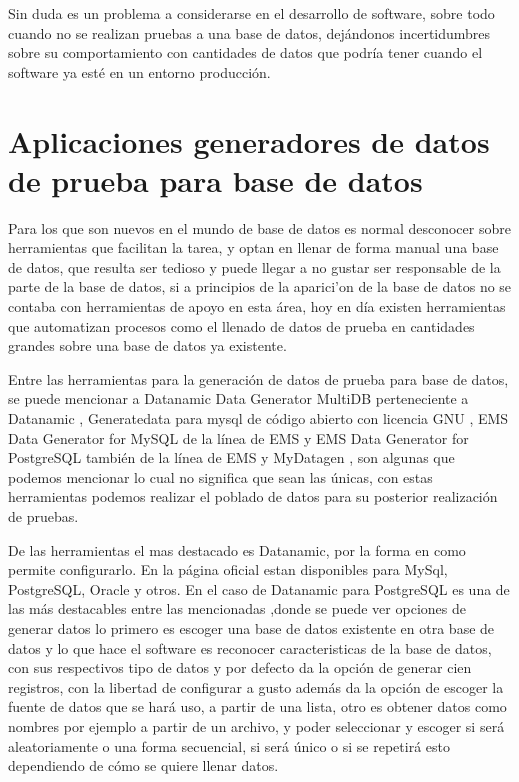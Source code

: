 Sin duda es un problema a considerarse en el desarrollo de software, sobre todo cuando no se realizan pruebas a una base de datos, dej\'andonos incertidumbres sobre su comportamiento con cantidades de datos que podr\'ia tener cuando el software ya est\'e en un entorno producci\'on.
\section{Aplicaciones generadores de datos de prueba para base de datos}
Para los que son nuevos en el mundo de base de datos es normal desconocer sobre herramientas que facilitan la tarea, y optan en llenar de forma manual una base de datos, que resulta ser tedioso y puede llegar a no gustar ser responsable de la parte de la base de datos, si a principios de la aparici'on de la base de datos no se contaba con herramientas de apoyo en esta \'area, hoy en d\'ia existen herramientas que automatizan procesos como el llenado de datos de prueba en cantidades grandes sobre una base de datos ya existente. 

Entre las herramientas para la generaci\'on de datos de prueba para base de datos, se puede mencionar a Datanamic Data Generator MultiDB perteneciente a Datanamic \cite{datanamic}, Generatedata para mysql de c\'odigo abierto con licencia GNU \cite{generatedata}, EMS Data Generator for MySQL de la l\'inea de EMS y EMS Data Generator for PostgreSQL tambi\'en de la l\'inea de EMS \cite{emsdatagenerator} y MyDatagen \cite{mydatagen}, son algunas que podemos mencionar lo cual no significa que sean las \'unicas, con estas herramientas podemos realizar el poblado de datos para su posterior realizaci\'on de pruebas.

De las herramientas el mas destacado es Datanamic, por la forma en como permite configurarlo. En la p\'agina oficial \cite{datanamic} estan disponibles para MySql, PostgreSQL, Oracle y otros. En el caso de Datanamic para PostgreSQL es una de las  m\'as destacables entre las mencionadas ,donde se puede ver opciones de generar datos lo primero es escoger una base de datos existente en otra base de datos y lo que hace el software es reconocer caracteristicas de la base de datos, con sus respectivos tipo de datos y por defecto da la opci\'on de generar cien registros, con la libertad de configurar a gusto adem\'as da la opci\'on de escoger la fuente de datos que se har\'a uso, a partir de una lista, otro es obtener datos como nombres por ejemplo a partir de un archivo, y poder seleccionar y escoger si ser\'a aleatoriamente o una forma secuencial, si ser\'a \'unico o si se repetir\'a esto dependiendo de c\'omo se quiere llenar datos.

